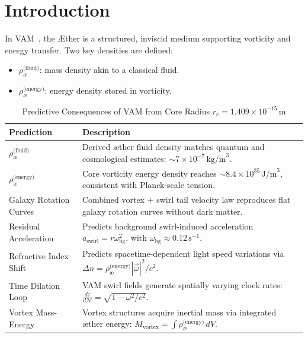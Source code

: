 \documentclass[12pt]{article}
\begin{document}
    \section{Introduction}

    In VAM~\cite{iskandarani2025vam2}, the \AE{}ther is a structured, inviscid medium supporting vorticity and energy transfer. Two key densities are defined:
    \begin{itemize}
        \item $\rho_{\text{\ae}}^{\text{(fluid)}}$: mass density akin to a classical fluid.
        \item $\rho_{\text{\ae}}^{\text{(energy)}}$: energy density stored in vorticity.
    \end{itemize}

    \begin{table}[H]
        \footnotesize
        \centering
        \renewcommand{\arraystretch}{1.2}
        \begin{tabular}{|l|p{10.5cm}|}
            \hline
            \textbf{Prediction} & \textbf{Description} \\
            \hline
            \(\rho_{\text{\ae}}^{\text{(fluid)}}\) & Derived æther fluid density matches quantum and cosmological estimates: \( \sim 7 \times 10^{-7} \, \text{kg/m}^3 \). \\
            \hline
            \(\rho_{\text{\ae}}^{\text{(energy)}}\) & Core vorticity energy density reaches \( \sim 8.4 \times 10^{35} \, \text{J/m}^3 \), consistent with Planck-scale tension. \\
            \hline
            Galaxy Rotation Curves & Combined vortex + swirl tail velocity law reproduces flat galaxy rotation curves without dark matter. \\
            \hline
            Residual Acceleration & Predicts background swirl-induced acceleration \( a_{\text{swirl}} = r \omega_{\text{bg}}^2 \), with \( \omega_{\text{bg}} \approx 0.12 \, \text{s}^{-1} \). \\
            \hline
            Refractive Index Shift & Predicts spacetime-dependent light speed variations via \( \Delta n = \rho_{\text{\ae}}^{\text{(energy)}} |\vec{\omega}|^2 / c^2 \). \\
            \hline
            Time Dilation Loop & VAM swirl fields generate spatially varying clock rates: \( \frac{d\tau}{d\mathcal{N}} = \sqrt{1 - \omega^2/c^2} \). \\
            \hline
            Vortex Mass-Energy & Vortex structures acquire inertial mass via integrated æther energy: \( M_{\text{vortex}} = \int \rho_{\text{\ae}}^{\text{(energy)}} \, dV \). \\
            \hline
        \end{tabular}
        \caption{Predictive Consequences of VAM from Core Radius \( r_c = 1.409 \times 10^{-15} \, \text{m} \)}
        \label{tab:vam_predictions}
    \end{table}
\end{document}

